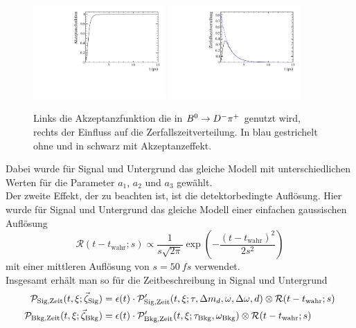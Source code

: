 \begin{figure}[tbp]
	\centering
		\includegraphics[width=0.45\textwidth]{fig/akzeptanz.pdf}
		\includegraphics[width=0.45\textwidth]{fig/akzept_expo.pdf}
	\caption{Links die Akzeptanzfunktion die in ${{B}^0}\rightarrow{\ensuremath{{D}^-}}{\ensuremath{{\pi}^+}}$ genutzt wird, rechts der Einfluss auf die Zerfallszeitverteilung. In blau gestrichelt ohne und in schwarz mit Akzeptanzeffekt.}
	\label{fig:akzeptanz} 
\end{figure}
Dabei wurde für Signal und Untergrund das gleiche Modell mit  unterschiedlichen Werten für die Parameter $a_1$, $a_2$ und $a_3$ gewählt.\\
Der zweite Effekt, der zu beachten ist, ist die detektorbedingte Auflösung. Hier wurde für Signal und Untergrund das gleiche Modell einer einfachen gaussischen Auflösung 
\begin{equation}
\mathcal{R}(t-t_\text{wahr};s)\propto\frac{1}{s\sqrt{2\pi}}\exp\left(-\frac{\left(t-t_\text{wahr}\right)^2}{2s^2}\right)
\end{equation}
mit einer mittleren Auflösung von $s=\SI{50}{fs}$ verwendet.\\
Insgesamt erhält man so für die Zeitbeschreibung in Signal und Untergrund
\begin{equation}
\begin{split}
\mathcal{P}_\text{Sig,Zeit}(t,\xi;\vec{\zeta}_\text{Sig})&=\epsilon(t)\cdot\mathcal{P}'_\text{Sig,Zeit}(t,\xi;\tau,{\Delta m_{{d}}},\omega,\Delta\omega,d)\otimes\mathcal{R}(t-t_\text{wahr};s)\\
\mathcal{P}_\text{Bkg,Zeit}(t,\xi;\vec{\zeta}_\text{Bkg})&=\epsilon(t)\cdot\mathcal{P}'_\text{Bkg,Zeit}(t,\xi;\tau_\text{Bkg},\omega_\text{Bkg})\otimes\mathcal{R}(t-t_\text{wahr};s)
\end{split}
\end{equation}

